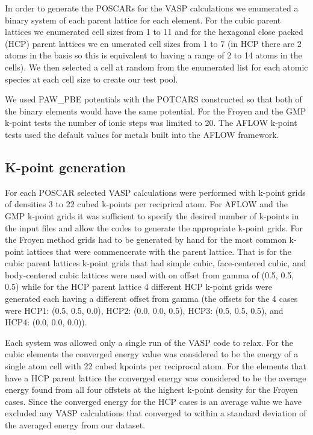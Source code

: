 \documentclass[12pt,prb,reprint]{revtex4-1}
\begin{document}
In order to generate the POSCARs for the VASP calculations we
enumerated\cite{enum3} a binary system of each parent lattice for each
element. For the cubic parent lattices we enumerated cell sizes from 1
to 11 and for the hexagonal close packed (HCP) parent lattices we en
umerated cell sizes from 1 to 7 (in HCP there are 2 atoms in the basis
so this is equivalent to having a range of 2 to 14 atoms in the
cells). We then selected a cell at random from the enumerated list for
each atomic species at each cell size to create our test pool.

We used PAW\_PBE potentials with the POTCARS constructed so that both
of the binary elements would have the same potential. For the Froyen
and the GMP k-point tests the number of ionic steps was limited to
20. The AFLOW k-point tests used the default values for metals built
into the AFLOW framework.

\subsection{K-point generation} \label{k-grid}

For each POSCAR selected VASP calculations were performed with k-point
grids of densities 3 to 22 cubed k-points per reciprical atom. For
AFLOW and the GMP k-point grids it was sufficient to specify the
desired number of k-points in the input files and allow the codes to
generate the appropriate k-point grids. For the Froyen method grids
had to be generated by hand for the most common k-point lattices that
were commencerate with the parent lattice. That is for the cubic
parent lattices k-point grids that had simple cubic, face-centered
cubic, and body-centered cubic lattices were used with on offset from
gamma of (0.5, 0.5, 0.5) while for the HCP parent lattice 4 different
HCP k-point grids were generated each having a different offset from
gamma (the offsets for the 4 cases were HCP1: (0.5, 0.5, 0.0), HCP2:
(0.0, 0.0, 0.5), HCP3: (0.5, 0.5, 0.5), and HCP4: (0.0, 0.0, 0.0)).

Each system was allowed only a single run of the VASP code to
relax. For the cubic elements the converged energy value was
considered to be the energy of a single atom cell with 22 cubed
kpoints per reciprocal atom. For the elements that have a HCP parent
lattice the converged energy was considered to be the average energy
found from all four offstets at the highest k-point density for the
Froyen cases. {\color{red}Since the converged energy for the HCP cases is an
average value we have excluded any VASP calculations that converged to
within a standard deviation of the averaged energy from our dataset.}
\end{document}
